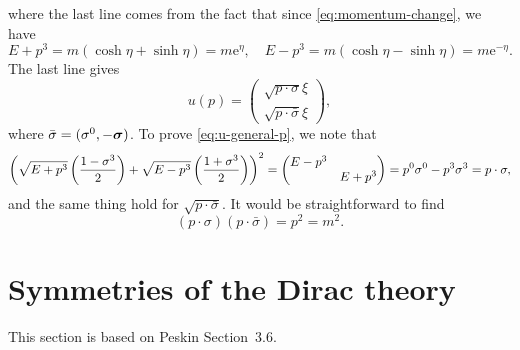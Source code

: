 \documentclass[hyperref, a4paper]{article}
\newcommand*{\ee}{\mathrm{e}}
\begin{document}
where the last line comes from the fact that since \eqref{eq:momentum-change}, we have 
\[
    E + p^3 = m (\cosh \eta + \sinh \eta) = m \ee^{\eta}, \quad 
    E - p^3 = m (\cosh \eta - \sinh \eta) = m \ee^{-\eta}.
\]
The last line gives 
\begin{equation}
    u(p) = \left(\begin{array}{c}
        \sqrt{p \cdot \sigma} \xi \\
        \sqrt{p \cdot \bar{\sigma}} \xi
        \end{array}\right),
    \label{eq:u-general-p}
\end{equation}
where $\bar{\sigma} = (\sigma^0, - \vb*{\sigma})$. 
To prove \eqref{eq:u-general-p}, we note that 
\[
    \left(\sqrt{E+p^{3}}\left(\frac{1-\sigma^{3}}{2}\right)+\sqrt{E-p^{3}}\left(\frac{1+\sigma^{3}}{2}\right)\right)^2 = 
    \pmqty{\dmat{E - p^3, E + p^3}} = p^0 \sigma^0 - p^3 \sigma^3 = p \cdot \sigma,
\]
and the same thing hold for $\sqrt{p \cdot \bar{\sigma}}$. 
It would be straightforward to find 
\begin{equation}
    (p \cdot \sigma)(p \cdot \bar{\sigma})=p^{2}=m^{2}.
\end{equation}

\section{Symmetries of the Dirac theory}

This section is based on Peskin Section~3.6.
\end{document}
